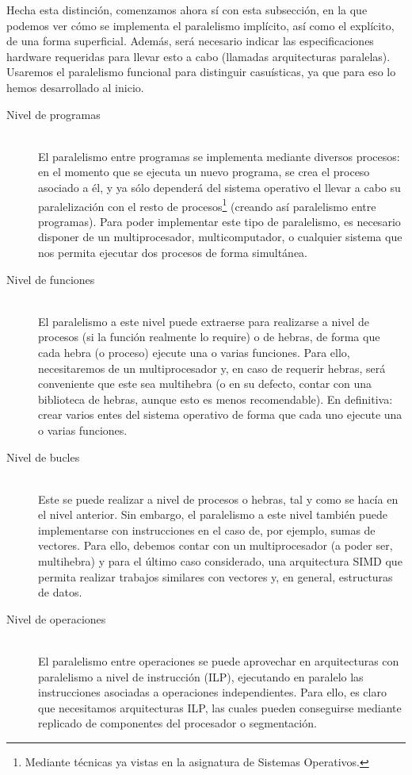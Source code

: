 Hecha esta distinción, comenzamos ahora sí con esta subsección, en la que podemos ver cómo se implementa el paralelismo implícito, así como el explícito, de una forma superficial. Además, será necesario indicar las especificaciones hardware requeridas para llevar esto a cabo (llamadas arquitecturas paralelas). Usaremos el paralelismo funcional para distinguir casuísticas, ya que para eso lo hemos desarrollado al inicio.
\begin{description}
    \item [Nivel de programas]~\\
        El paralelismo entre programas se implementa mediante diversos procesos: en el momento que se ejecuta un nuevo programa, se crea el proceso asociado a él, y ya sólo dependerá del sistema operativo el llevar a cabo su paralelización con el resto de procesos\footnote{Mediante técnicas ya vistas en la asignatura de Sistemas Operativos.} (creando así paralelismo entre programas). Para poder implementar este tipo de paralelismo, es necesario disponer de un multiprocesador, multicomputador, o cualquier sistema que nos permita ejecutar dos procesos de forma simultánea.

    \item [Nivel de funciones]~\\
        El paralelismo a este nivel puede extraerse para realizarse a nivel de procesos (si la función realmente lo require) o de hebras, de forma que cada hebra (o proceso) ejecute una o varias funciones. Para ello, necesitaremos de un multiprocesador y, en caso de requerir hebras, será conveniente que este sea multihebra (o en su defecto, contar con una biblioteca de hebras, aunque esto es menos recomendable). En definitiva: crear varios entes del sistema operativo de forma que cada uno ejecute una o varias funciones.

    \item [Nivel de bucles]~\\
        Este se puede realizar a nivel de procesos o hebras, tal y como se hacía en el nivel anterior. Sin embargo, el paralelismo a este nivel también puede implementarse con instrucciones en el caso de, por ejemplo, sumas de vectores. Para ello, debemos contar con un multiprocesador (a poder ser, multihebra) y para el último caso considerado, una arquitectura SIMD que permita realizar trabajos similares con vectores y, en general, estructuras de datos.

    \item [Nivel de operaciones]~\\
        El paralelismo entre operaciones se puede aprovechar en arquitecturas con paralelismo a nivel de instrucción (ILP), ejecutando en paralelo las instrucciones asociadas a operaciones independientes. Para ello, es claro que necesitamos arquitecturas ILP, las cuales pueden conseguirse mediante replicado de componentes del procesador o segmentación.
\end{description}

